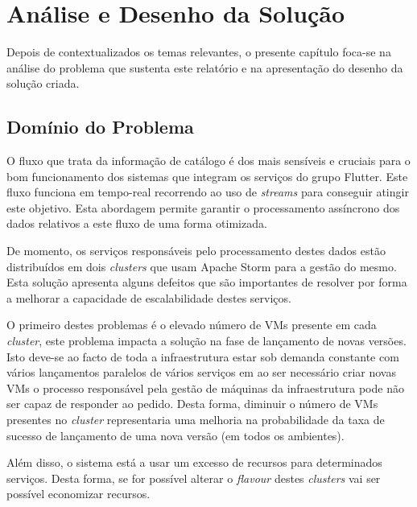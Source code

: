 \chapter{Análise e Desenho da Solução}
\label{sec:3-Analise}

Depois de contextualizados os temas relevantes, o presente capítulo foca-se na análise do problema 
que sustenta este relatório e na apresentação do desenho da solução criada.

\section{Domínio do Problema}

O fluxo que trata da informação de catálogo é dos mais sensíveis e cruciais para o bom funcionamento
dos sistemas que integram os serviços do grupo Flutter. Este fluxo funciona em tempo-real recorrendo
ao uso de \textit{streams} para conseguir atingir este objetivo. Esta abordagem permite garantir
o processamento assíncrono dos dados relativos a este fluxo de uma forma otimizada.

De momento, os serviços responsáveis pelo processamento destes dados estão distribuídos em dois
\textit{clusters} que usam Apache Storm para a gestão do mesmo. Esta solução apresenta alguns
defeitos que são importantes de resolver por forma a melhorar a capacidade de escalabilidade destes
serviços. 

O primeiro destes problemas é o elevado número de \acp{VM} presente em cada \textit{cluster},
este problema impacta a solução na fase de lançamento de novas versões. Isto deve-se ao facto de
toda a infraestrutura estar sob demanda constante com vários lançamentos paralelos de vários serviços
em ao ser necessário criar novas \acp{VM} o processo responsável pela gestão de máquinas da
infraestrutura pode não ser capaz de responder ao pedido. Desta forma, diminuir o número de \acp{VM}
presentes no \textit{cluster} representaria uma melhoria na probabilidade da taxa de sucesso de
lançamento de uma nova versão (em todos os ambientes).

Além disso, o sistema está a usar um excesso de recursos para determinados serviços. Desta forma,
se for possível alterar o \textit{\gls{flavour}} destes \textit{clusters} vai ser possível economizar
recursos.




